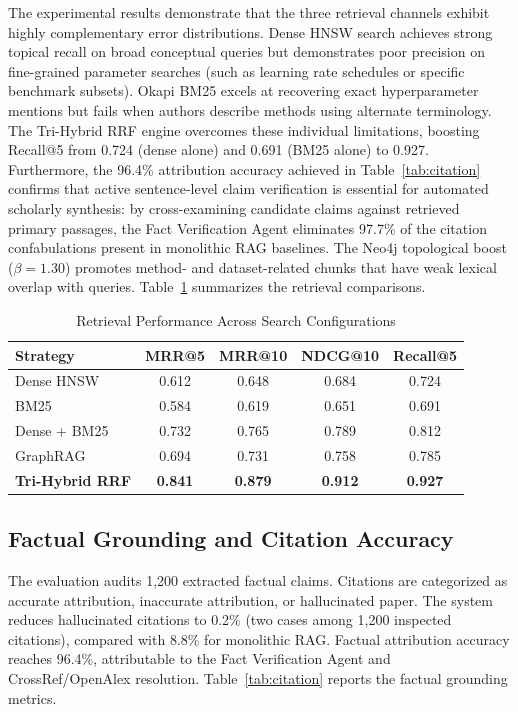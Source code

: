 \documentclass[conference]{IEEEtran}
\begin{document}
The experimental results demonstrate that the three retrieval channels exhibit highly complementary error distributions. Dense HNSW search achieves strong topical recall on broad conceptual queries but demonstrates poor precision on fine-grained parameter searches (such as learning rate schedules or specific benchmark subsets). Okapi BM25 excels at recovering exact hyperparameter mentions but fails when authors describe methods using alternate terminology. The Tri-Hybrid RRF engine overcomes these individual limitations, boosting Recall@5 from 0.724 (dense alone) and 0.691 (BM25 alone) to 0.927. Furthermore, the 96.4\% attribution accuracy achieved in Table~\ref{tab:citation} confirms that active sentence-level claim verification is essential for automated scholarly synthesis: by cross-examining candidate claims against retrieved primary passages, the Fact Verification Agent eliminates 97.7\% of the citation confabulations present in monolithic RAG baselines. The Neo4j topological boost ($\beta = 1.30$) promotes method- and dataset-related chunks that have weak lexical overlap with queries. Table~\ref{tab:retrieval} summarizes the retrieval comparisons.

\begin{table}[!t]
\caption{Retrieval Performance Across Search Configurations}
\label{tab:retrieval}
\centering
\footnotesize
\setlength{\tabcolsep}{3.5pt}
\begin{tabular}{@{}lcccc@{}}
\toprule
\textbf{Strategy} & \textbf{MRR@5} & \textbf{MRR@10} & \textbf{NDCG@10} & \textbf{Recall@5} \\
\midrule
Dense HNSW & 0.612 & 0.648 & 0.684 & 0.724 \\
BM25 & 0.584 & 0.619 & 0.651 & 0.691 \\
Dense + BM25 & 0.732 & 0.765 & 0.789 & 0.812 \\
GraphRAG & 0.694 & 0.731 & 0.758 & 0.785 \\
\textbf{Tri-Hybrid RRF} & \textbf{0.841} & \textbf{0.879} & \textbf{0.912} & \textbf{0.927} \\
\bottomrule
\end{tabular}
\end{table}



\subsection{Factual Grounding and Citation Accuracy}
The evaluation audits 1,200 extracted factual claims. Citations are categorized as accurate attribution, inaccurate attribution, or hallucinated paper. The system reduces hallucinated citations to 0.2\% (two cases among 1,200 inspected citations), compared with 8.8\% for monolithic RAG. Factual attribution accuracy reaches 96.4\%, attributable to the Fact Verification Agent and CrossRef/OpenAlex resolution. Table~\ref{tab:citation} reports the factual grounding metrics.
\end{document}
